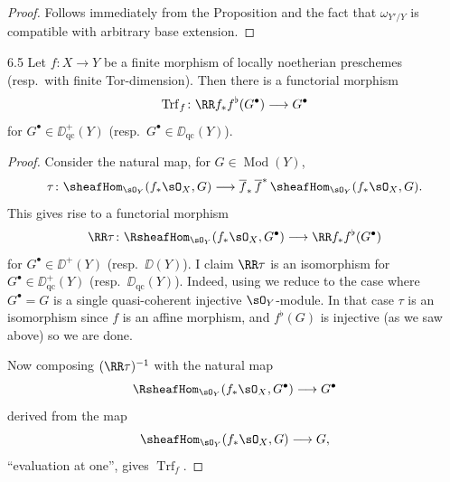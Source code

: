 \begin{proof}
Follows immediately from the Proposition and the fact that $\omega_{Y'/Y}$ is compatible with arbitrary base extension.
\end{proof}

\begin{bookproposition}{6.5}\label{prop:3.6.5}
Let $f\colon X\to Y$ be a finite morphism of locally noetherian preschemes (resp.\ with finite Tor-dimension). Then there is a functorial morphism
\[
\operatorname{Trf}_f \colon \RR f_* f^{\flat}(G^\bullet) \longrightarrow G^\bullet
\]
for $G^\bullet\in\DD_{\mathrm{qc}}^+(Y)$ (resp.\ $G^\bullet\in\DD_{\mathrm{qc}}(Y)$).
\end{bookproposition}

\begin{proof}
Consider the natural map, for $G\in\operatorname{Mod}(Y)$,
\[
\tau\colon \sheafHom_{\sO_Y}(f_*\sO_X,G) \longrightarrow \overline{f}_*\,\overline{f}^*\,\sheafHom_{\sO_Y}(f_*\sO_X,G).
\]
This gives rise to a functorial morphism 
\[
\RR\tau \colon \RsheafHom_{\sO_Y}(f_*\sO_X, G^\bullet) \longrightarrow \RR f_* f^{\flat}(G^\bullet)
\]
for $G^\bullet\in\DD^+(Y)$ (resp.\ $\DD(Y)$). I claim $\RR\tau$ is an isomorphism for $G^\bullet\in\DD_{\mathrm{qc}}^+(Y)$ (resp.\ $\DD_{\mathrm{qc}}(Y)$). Indeed, using  we reduce to the case where $G^\bullet=G$ is a single quasi-coherent injective $\sO_Y$-module. In that case $\tau$ is an isomorphism \cite[\nopp II,~1.4.3]{EGA} since $f$ is an affine morphism, and $f^{\flat}(G)$ is injective (as we saw above) so we are done.

Now composing $(\RR\tau)^{-1}$ with the natural map
\[
\RsheafHom_{\sO_Y}(f_*\sO_X,G^\bullet) \longrightarrow G^\bullet
\]
derived from the map
\[
\sheafHom_{\sO_Y}(f_*\sO_X,G) \longrightarrow G,
\]
``evaluation at one'', gives $\operatorname{Trf}_f$.
\end{proof}

